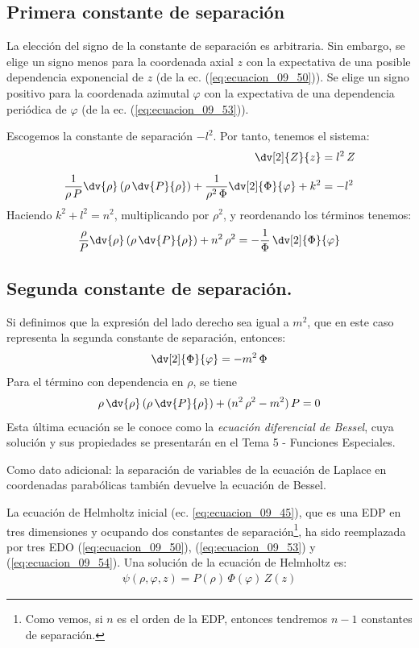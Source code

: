 \subsection{Primera constante de separación}
La elección del signo de la constante de separación es arbitraria. Sin embargo, se elige un signo menos para la coordenada axial $z$ con la expectativa de una posible dependencia exponencial de $z$ (de la ec. (\ref{eq:ecuacion_09_50})). Se elige un signo positivo para la coordenada azimutal $\varphi$ con la expectativa de una dependencia periódica de $\varphi$ (de la ec. (\ref{eq:ecuacion_09_53})).
\par
Escogemos la constante de separación $- l^{2}$. Por tanto, tenemos el sistema:
\begin{align}
\dv[2]{Z}{z} &= l^{2} \, Z \label{eq:ecuacion_09_50} \\[0.5em]
\dfrac{1}{\rho \, P} \dv{\rho} \left( \rho \, \dv{P}{\rho} \right) + \dfrac{1}{\rho^{2} \, \Phi} \dv[2]{\Phi}{\varphi} + k^{2} &= - l^{2} \label{eq:ecuacion_09_51}
\end{align}
Haciendo $k^{2} + l^{2} = n^{2}$, multiplicando por $\rho^{2}$, y reordenando los términos tenemos:
\begin{align}
\dfrac{\rho}{P} \dv{\rho} \left( \rho \, \dv{P}{\rho} \right) + n^{2} \, \rho^{2} = - \dfrac{1}{\Phi} \, \dv[2]{\Phi}{\varphi}
\label{eq:ecuacion_09_52}
\end{align}
\subsection{Segunda constante de separación.}
Si definimos que la expresión del lado derecho sea igual a $m^{2}$, que en este caso representa la segunda constante de separación, entonces:
\begin{align}
\dv[2]{\Phi}{\varphi} = - m^{2} \, \Phi
\label{eq:ecuacion_09_53}
\end{align}
Para el término con dependencia en $\rho$, se tiene
\begin{align}
\rho \, \dv{\rho} \left( \rho \, \dv{P}{\rho} \right) + (n^{2} \, \rho^{2} - m^{2}) \, P = 0
\label{eq:ecuacion_09_54}
\end{align}
Esta última ecuación se le conoce como la \emph{ecuación diferencial de Bessel}, cuya solución y sus propiedades se presentarán en el Tema 5 - Funciones Especiales. 
\par
Como dato adicional: la separación de variables de la ecuación de Laplace en coordenadas parabólicas también devuelve la ecuación de Bessel.
\par
La ecuación de Helmholtz inicial (ec. \ref{eq:ecuacion_09_45}), que es una EDP en tres dimensiones y ocupando dos constantes de separación\footnote{Como vemos, si $n$ es el orden de la EDP, entonces tendremos $n-1$ constantes de separación.}, ha sido reemplazada por tres EDO (\ref{eq:ecuacion_09_50}), (\ref{eq:ecuacion_09_53}) y (\ref{eq:ecuacion_09_54}). Una solución de la ecuación de Helmholtz es:
\begin{align}
\psi (\rho, \varphi, z) = P(\rho) \, \Phi (\varphi) \, Z(z)
\label{eq:ecuacion_09_55}    
\end{align}
